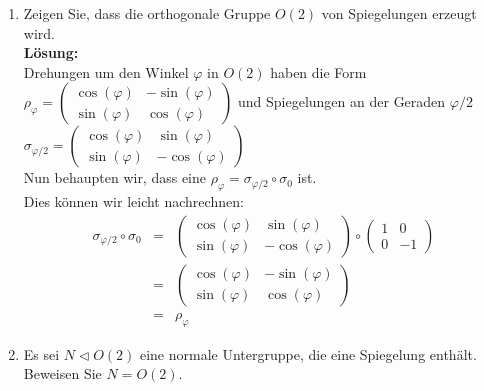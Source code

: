 \documentclass[11pt,a4paper,ngerman]{article}
\begin{document}
\begin{enumerate}[\bfseries a)]
\item Zeigen Sie, dass die orthogonale Gruppe $O(2)$ von Spiegelungen erzeugt wird.\\

\textbf{Lösung:}\\

Drehungen um den Winkel $\varphi$  in $O(2)$ haben die Form \\$\rho_{\varphi} = \begin{pmatrix} \cos (\varphi) & - \sin (\varphi) \\ \sin (\varphi) & \cos (\varphi) \end{pmatrix}$ und Spiegelungen an der Geraden $\varphi / 2 $ \\$\sigma_{\varphi / 2} = \begin{pmatrix} \cos (\varphi) & \sin (\varphi ) \\ \sin (\varphi ) & - \cos ( \varphi ) \end{pmatrix}$\\

Nun behaupten wir, dass eine $\rho_\varphi = \sigma_{\varphi / 2} \circ \sigma_0$ ist.\\
Dies können wir leicht nachrechnen:
$$
\begin{array}{rcl}
\sigma_{\varphi / 2} \circ \sigma_0 &=& 
\begin{pmatrix} \cos (\varphi) & \sin (\varphi ) \\ \sin (\varphi ) & - \cos ( \varphi ) \end{pmatrix} \circ \begin{pmatrix} 1 & 0 \\ 0 & -1 \end{pmatrix} \\
&=&  \begin{pmatrix} \cos (\varphi) & - \sin (\varphi) \\ \sin (\varphi) & \cos (\varphi) \end{pmatrix}\\
&=& \rho_\varphi
\end{array}
$$

\item Es sei $N \vartriangleleft O(2)$ eine normale Untergruppe, die eine Spiegelung enthält. Beweisen Sie $N = O(2)$.\\


\end{enumerate}
\end{document}

